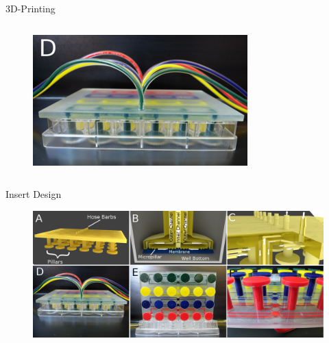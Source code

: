 \documentclass{beamer}
\begin{document}
\begin{frame}{3D-Printing}
\begin{columns}[c]
\begin{figure}
\includegraphics[width=1\linewidth]{images/insert-plate.png}

 \end{figure}
\end{columns}
\end{frame}

\begin{frame}{Insert Design}
\begin{figure}
\includegraphics[width=1\linewidth]{images/insert.png}\\
\hspace*{11pt}\hbox{\scriptsize {}}
 \end{figure}
\end{frame}
\end{document}
